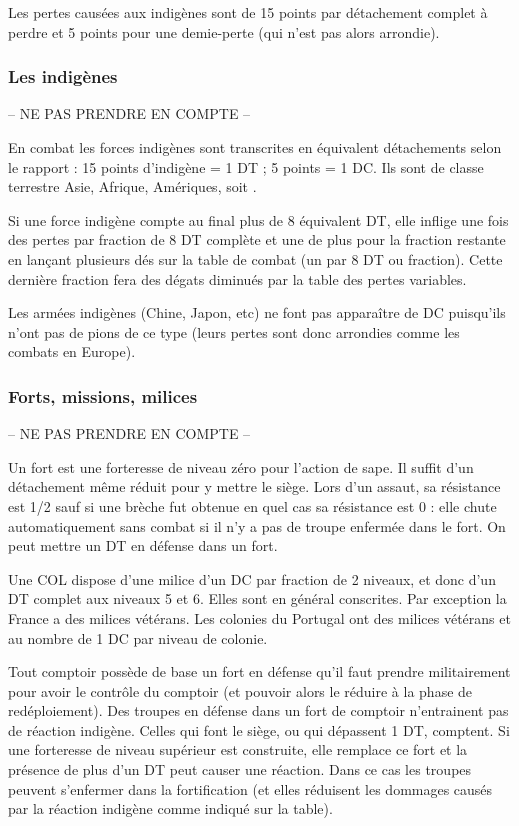 Les pertes causées aux indigènes sont de 15 points par détachement complet
à perdre et 5 points  pour une demie-perte (qui n'est pas alors arrondie).


\subsubsection{Les indigènes}
-- NE PAS PRENDRE EN COMPTE --

En combat les forces indigènes sont transcrites en équivalent détachements selon
le rapport : 15 points d'indigène = 1 DT ; 5 points = 1 DC.
Ils sont de classe terrestre Asie, Afrique, Amériques, soit \CAA.

Si une force indigène compte au final plus de 8 équivalent DT, elle inflige une fois
des pertes par fraction de 8 DT complète et une de plus pour la fraction restante
en lançant plusieurs dés sur la table de combat (un par 8 DT ou fraction).
Cette dernière fraction fera des dégats diminués par la table des pertes variables.

Les armées indigènes (Chine, Japon, etc) ne font pas apparaître de DC
puisqu'ils n'ont pas de pions de ce type (leurs pertes sont donc arrondies
comme les combats en Europe).

\subsubsection{Forts, missions, milices}
-- NE PAS PRENDRE EN COMPTE --

Un fort est une forteresse de niveau zéro pour l'action de sape.
Il suffit d'un détachement même réduit pour y mettre le siège.
Lors d'un assaut, sa résistance est 1/2 sauf si une brèche fut obtenue en
quel cas sa résistance est 0 : elle chute automatiquement sans combat
si il n'y a pas de troupe enfermée dans le fort. On peut mettre
un DT en défense dans un fort.

Une COL dispose d'une milice d'un DC par fraction de 2 niveaux, et donc
d'un DT complet aux niveaux 5 et 6. Elles sont en général conscrites. Par
exception la France a des milices vétérans. Les colonies du Portugal ont
des milices vétérans et au nombre de 1 DC par niveau de colonie.

Tout comptoir possède de base un fort en défense qu'il faut prendre
militairement pour avoir le contrôle du comptoir (et pouvoir
alors le réduire à la phase de redéploiement).
Des troupes en défense dans un fort de comptoir
n'entrainent pas de réaction indigène. Celles qui font le siège,
ou qui dépassent 1 DT, comptent. Si une forteresse de niveau supérieur est
construite, elle remplace ce fort et la présence de plus d'un DT peut
causer une réaction. Dans ce cas les troupes peuvent
s'enfermer dans la fortification (et elles réduisent les dommages
causés par la réaction indigène comme indiqué sur la
table).


